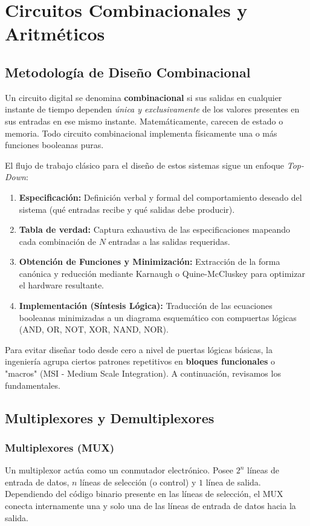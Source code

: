 \chapter{Circuitos Combinacionales y Aritméticos}

\section{Metodología de Diseño Combinacional}
Un circuito digital se denomina \textbf{combinacional} si sus salidas en cualquier instante de tiempo dependen \textit{única y exclusivamente} de los valores presentes en sus entradas en ese mismo instante. Matemáticamente, carecen de estado o memoria. Todo circuito combinacional implementa físicamente una o más funciones booleanas puras.

El flujo de trabajo clásico para el diseño de estos sistemas sigue un enfoque \textit{Top-Down}:
\begin{enumerate}
    \item \textbf{Especificación:} Definición verbal y formal del comportamiento deseado del sistema (qué entradas recibe y qué salidas debe producir).
    \item \textbf{Tabla de verdad:} Captura exhaustiva de las especificaciones mapeando cada combinación de $N$ entradas a las salidas requeridas.
    \item \textbf{Obtención de Funciones y Minimización:} Extracción de la forma canónica y reducción mediante Karnaugh o Quine-McCluskey para optimizar el hardware resultante.
    \item \textbf{Implementación (Síntesis Lógica):} Traducción de las ecuaciones booleanas minimizadas a un diagrama esquemático con compuertas lógicas (AND, OR, NOT, XOR, NAND, NOR).
\end{enumerate}

Para evitar diseñar todo desde cero a nivel de puertas lógicas básicas, la ingeniería agrupa ciertos patrones repetitivos en \textbf{bloques funcionales} o "macros" (MSI - Medium Scale Integration). A continuación, revisamos los fundamentales.

\section{Multiplexores y Demultiplexores}

\subsection{Multiplexores (MUX)}
Un multiplexor actúa como un conmutador electrónico. Posee $2^n$ líneas de entrada de datos, $n$ líneas de selección (o control) y $1$ línea de salida. Dependiendo del código binario presente en las líneas de selección, el MUX conecta internamente una y solo una de las líneas de entrada de datos hacia la salida.

